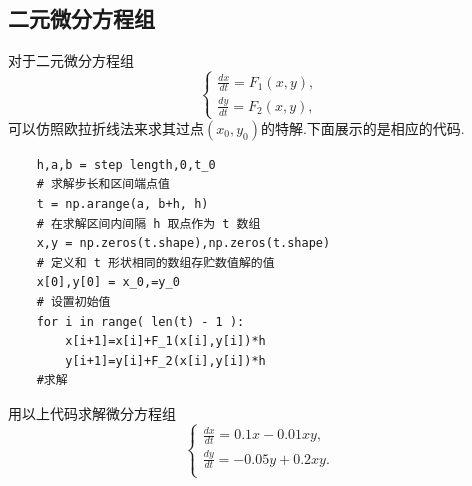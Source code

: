 \documentclass[a4paper]{article}%
\begin{document}
\subsection{二元微分方程组}
对于二元微分方程组
\begin{equation*}
        \begin{cases}
    \frac{dx}{dt}=F_1(x,y),\\
    \frac{dy}{dt}=F_2(x,y),
        \end{cases}
    \end{equation*}
可以仿照欧拉折线法来求其过点$(x_0,y_0)$的特解.下面展示的是相应的代码.
\begin{verbatim}
    h,a,b = step length,0,t_0
    # 求解步长和区间端点值
    t = np.arange(a, b+h, h)
    # 在求解区间内间隔 h 取点作为 t 数组
    x,y = np.zeros(t.shape),np.zeros(t.shape)
    # 定义和 t 形状相同的数组存贮数值解的值
    x[0],y[0] = x_0,=y_0
    # 设置初始值
    for i in range( len(t) - 1 ):
        x[i+1]=x[i]+F_1(x[i],y[i])*h
        y[i+1]=y[i]+F_2(x[i],y[i])*h
    #求解
\end{verbatim}


用以上代码求解微分方程组
\begin{equation*}
        \begin{cases}
    \frac{dx}{dt}=0.1x-0.01xy,\\
    \frac{dy}{dt}=-0.05y+0.2xy.\\
    \end{cases}
    \end{equation*}
\end{document}
